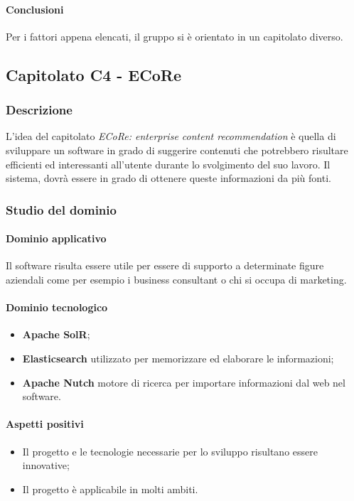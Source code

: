 	\paragraph{Conclusioni} \Spazio
	Per i fattori appena elencati, il gruppo si è orientato in un capitolato diverso.
	
	\subsection{Capitolato C4 - ECoRe}
	\subsubsection{Descrizione}
    L'idea del capitolato \emph{ECoRe: enterprise content recommendation} è quella di sviluppare un software in grado di suggerire contenuti che potrebbero risultare efficienti ed interessanti all'utente durante lo svolgimento del suo lavoro. Il sistema, dovrà essere in grado di ottenere queste informazioni da più fonti.
	
	\subsubsection{Studio del dominio} 
	\paragraph{Dominio applicativo} \Spazio
	Il software risulta essere utile per essere di supporto a determinate figure aziendali come per esempio i business consultant o chi si occupa di marketing.
	\paragraph{Dominio tecnologico}
		\begin{itemize}
		\item \textbf{Apache SolR}; 
		\item \textbf{Elasticsearch} utilizzato per memorizzare ed elaborare le informazioni;
		\item \textbf{Apache Nutch} motore di ricerca per importare informazioni dal web nel software.
	\end{itemize}
	
	\paragraph{Aspetti positivi} \Spazio
	\begin{itemize}
		\item Il progetto e le tecnologie necessarie per lo sviluppo risultano essere innovative;
		\item Il progetto è applicabile in molti ambiti.
	\end{itemize}
